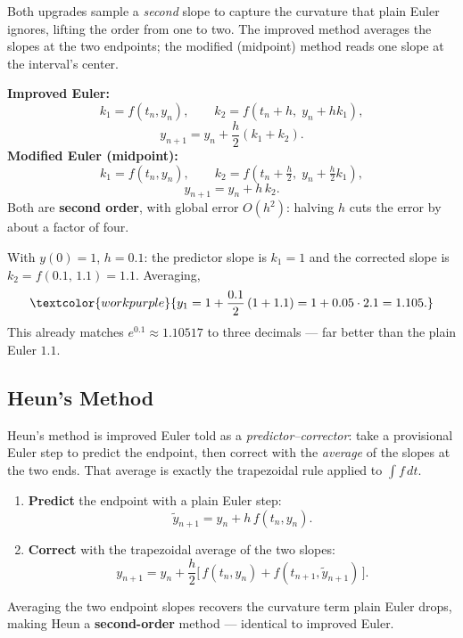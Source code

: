 Both upgrades sample a \emph{second} slope to capture the curvature that plain
Euler ignores, lifting the order from one to two. The improved method averages
the slopes at the two endpoints; the modified (midpoint) method reads one slope
at the interval's center.

\begin{formulabox}
\textbf{Improved Euler:}
\[ k_1 = f(t_n,y_n), \qquad k_2 = f\!\left(t_n+h,\; y_n+h k_1\right), \]
\[ y_{n+1} = y_n + \frac{h}{2}\left(k_1 + k_2\right). \]
\textbf{Modified Euler (midpoint):}
\[ k_1 = f(t_n,y_n), \qquad k_2 = f\!\left(t_n+\tfrac{h}{2},\; y_n+\tfrac{h}{2}k_1\right), \]
\[ y_{n+1} = y_n + h\,k_2. \]
Both are \textbf{second order}, with global error $O(h^{2})$: halving $h$ cuts the
error by about a factor of four.
\end{formulabox}

\begin{examplebox}[Worked Example 5.2: Improved Euler for $y'=y$]
With $y(0)=1$, $h=0.1$: the predictor slope is $k_1=1$ and the corrected slope is
$k_2=f(0.1,\,1.1)=1.1$. Averaging,
\[ \textcolor{workpurple}{y_1 = 1 + \frac{0.1}{2}\left(1 + 1.1\right) = 1 + 0.05\cdot 2.1 = 1.105.} \]
This already matches $e^{0.1}\approx 1.10517$ to three decimals --- far better than
the plain Euler $1.1$.
\end{examplebox}

\subsection{Heun's Method}

Heun's method is improved Euler told as a \emph{predictor--corrector}: take a
provisional Euler step to predict the endpoint, then correct with the
\emph{average} of the slopes at the two ends. That average is exactly the
trapezoidal rule applied to $\int f\,dt$.

\begin{methodbox}
\begin{enumerate}[leftmargin=1.6em, itemsep=2pt]
    \item \textbf{Predict} the endpoint with a plain Euler step:
          \[ \tilde{y}_{n+1} = y_n + h\,f(t_n,y_n). \]
    \item \textbf{Correct} with the trapezoidal average of the two slopes:
          \[ y_{n+1} = y_n + \frac{h}{2}\Big[\,f(t_n,y_n) + f(t_{n+1},\tilde{y}_{n+1})\,\Big]. \]
\end{enumerate}
Averaging the two endpoint slopes recovers the curvature term plain Euler drops,
making Heun a \textbf{second-order} method --- identical to improved Euler.
\end{methodbox}

